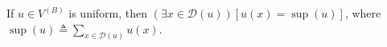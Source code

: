 If $u \in V^{(B)}$ is uniform, then $(\exists x \in \mathcal{D}(u))[u(x) = \sup(u)]$, where $\sup(u) \triangleq \sum_{x \in \mathcal{D}(u)} u(x)$.
